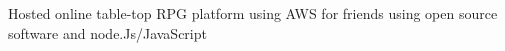 \documentclass[letter,10pt]{article}
\begin{document}
\begin{zitemize}
\item Hosted online table-top RPG platform using AWS for friends using open source software and node.Js/JavaScript
\end{zitemize}
\end{document}
